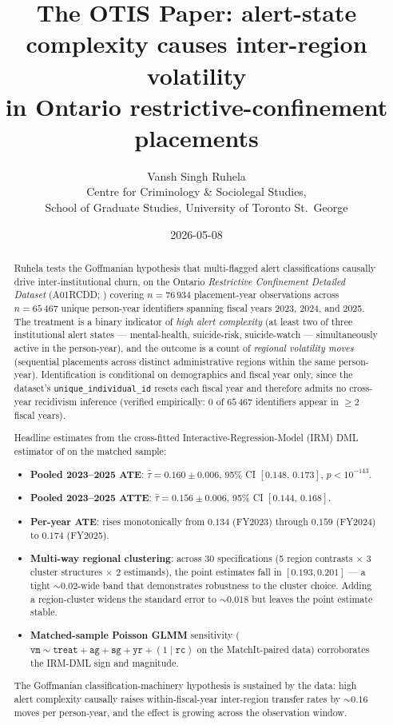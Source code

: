 \documentclass[11pt,a4paper]{article}
\title{\textbf{The OTIS Paper}: alert-state complexity causes inter-region
  volatility \\ in Ontario restrictive-confinement placements}
\author{Vansh Singh Ruhela \\
  \small Centre for Criminology \& Sociolegal Studies, \\
  \small School of Graduate Studies, University of Toronto St.\ George}
\date{2026-05-08}
\newcommand{\1}{\mathbf{1}}
\theoremstyle{plain}
\theoremstyle{definition}
\begin{document}
\maketitle

\begin{abstract}
Ruhela tests the Goffmanian \cite{goffman1961asylums} hypothesis that
multi-flagged alert classifications causally drive inter-institutional
churn, on the Ontario \emph{Restrictive Confinement Detailed Dataset}
(A01RCDD; \cite{Ontario_SOLGEN_RC_DetailedDataset_2025}) covering
$n = 76\,934$ placement-year observations across $n = 65\,467$ unique
person-year identifiers spanning fiscal years 2023, 2024, and 2025.
The treatment is a binary indicator of \emph{high alert complexity}
(at least two of three institutional alert states — mental-health,
suicide-risk, suicide-watch — simultaneously active in the
person-year), and the outcome is a count of \emph{regional volatility
moves} (sequential placements across distinct administrative regions
within the same person-year).  Identification is conditional on
demographics and fiscal year only, since the dataset's
\texttt{unique\_individual\_id} resets each fiscal year and therefore
admits no cross-year recidivism inference (verified empirically:
$0$ of $65\,467$ identifiers appear in $\ge 2$ fiscal years).

Headline estimates from the cross-fitted Interactive-Regression-Model
(IRM) DML estimator of \cite{chernozhukov2018dml} on the matched
sample:
\begin{itemize}
\setlength{\itemsep}{1pt}
\item \textbf{Pooled 2023--2025 ATE}: $\widehat\tau = 0.160 \pm 0.006$,
      95\% CI $[0.148,\,0.173]$, $p<10^{-143}$.
\item \textbf{Pooled 2023--2025 ATTE}: $\widehat\tau = 0.156 \pm 0.006$,
      95\% CI $[0.144,\,0.168]$.
\item \textbf{Per-year ATE}: rises monotonically from $0.134$ (FY2023)
      through $0.159$ (FY2024) to $\mathbf{0.174}$ (FY2025).
\item \textbf{Multi-way regional clustering}: across 30 specifications
      (5 region contrasts $\times$ 3 cluster structures $\times$ 2
      estimands), the point estimates fall in $[0.193, 0.201]$ — a
      tight $\sim 0.02$-wide band that demonstrates robustness to the
      cluster choice.  Adding a region-cluster widens the standard
      error to $\sim 0.018$ but leaves the point estimate stable.
\item \textbf{Matched-sample Poisson GLMM} sensitivity ($\texttt{vm}
      \sim \texttt{treat} + \texttt{ag} + \texttt{sg} + \texttt{yr} +
      (1\mid\texttt{rc})$ on the MatchIt-paired data) corroborates
      the IRM-DML sign and magnitude.
\end{itemize}
The Goffmanian classification-machinery hypothesis is sustained by
the data: high alert complexity causally raises within-fiscal-year
inter-region transfer rates by $\sim 0.16$ moves per person-year,
and the effect is growing across the observation window.
\end{abstract}
\end{document}
